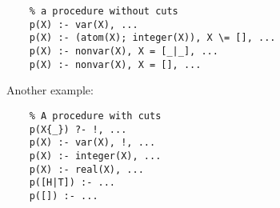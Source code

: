 \begin{verbatim}
    % a procedure without cuts
    p(X) :- var(X), ...
    p(X) :- (atom(X); integer(X)), X \= [], ...
    p(X) :- nonvar(X), X = [_|_], ...
    p(X) :- nonvar(X), X = [], ...
\end{verbatim}

Another example:
\begin{verbatim}
    % A procedure with cuts
    p(X{_}) ?- !, ...
    p(X) :- var(X), !, ...
    p(X) :- integer(X), ...
    p(X) :- real(X), ...
    p([H|T]) :- ...
    p([]) :- ...
\end{verbatim}



